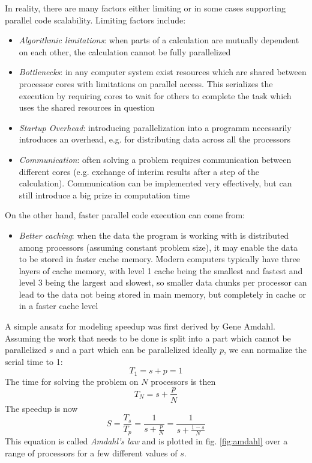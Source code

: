 \documentclass[main.tex]{subfiles}
\begin{document}
In reality, there are many factors either limiting or in some cases supporting parallel code scalability. Limiting factors include:
\begin{itemize}
    \item \emph{Algorithmic limitations}: when parts of a calculation are mutually dependent on each other, the calculation cannot be fully parallelized
    \item \emph{Bottlenecks}: in any computer system exist resources which are shared between processor cores with limitations on parallel access. This serializes the execution by requiring cores to wait for others to complete the task which uses the shared resources in question
    \item \emph{Startup Overhead}: introducing parallelization into a programm necessarily introduces an overhead, e.g. for distributing data across all the processors
    \item \emph{Communication}: often solving a problem requires communication between different cores (e.g. exchange of interim results after a step of the calculation). Communication can be implemented very effectively, but can still introduce a big prize in computation time
\end{itemize}
On the other hand, faster parallel code execution can come from:
\begin{itemize}
    \item \emph{Better caching}: when the data the program is working with is distributed among processors (assuming constant problem size), it may enable the data to be stored in faster cache memory. Modern computers typically have three layers of cache memory, with level 1 cache being the smallest and fastest and level 3 being the largest and slowest, so smaller data chunks per processor can lead to the data not being stored in main memory, but completely in cache or in a faster cache level
\end{itemize}

A simple ansatz for modeling speedup was first derived by Gene Amdahl.
Assuming the work that needs to be done is split into a part which cannot be parallelized \(s\) and a part which can be parallelized ideally \(p\), we can normalize the serial time to 1:
\begin{equation}
    T_1 = s + p = 1
\end{equation}
The time for solving the problem on \(N\) processors is then
\begin{equation}
    T_N = s + \frac{p}{N}
\end{equation}
The speedup is now
\begin{equation}\label{eq:amdahls_law}
    S = \frac{T_s}{T_p} = \frac{1}{s + \frac{p}{N}} = \frac{1}{s + \frac{1 - s}{N}}
\end{equation}
This equation is called \emph{Amdahl's law} and is plotted in fig. \ref{fig:amdahl} over a range of processors for a few different values of \(s\).
\end{document}
